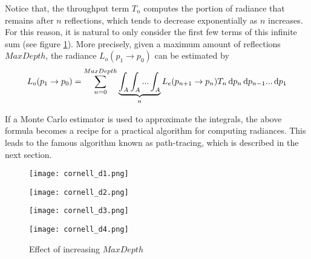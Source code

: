 Notice that, the throughput term $T_n$ computes the portion of radiance that remains after $n$ reflections, which tends to decrease exponentially as $n$ increases. For this reason, it is natural to only consider the first few terms of this infinite sum (see figure \ref{fig maxdepth}). More precisely, given a maximum amount of reflections $MaxDepth$, the radiance $L_o(p_1\to p_0)$ can be estimated by 
\begin{align}
    L_o(p_1\to p_0) = \sum_{n=0}^{MaxDepth} \underbrace{\int_A \int_A...\int_A}_{n} L_e(p_{n+1}\to p_{n})T_n \,\mathrm{d} p_{n} \,\mathrm{d} p_{n-1}...\,\mathrm{d} p_1
    \label{rendering equation path tracing}
\end{align}

If a Monte Carlo estimator is used to approximate the integrals, the above formula becomes a recipe for a practical algorithm for computing radiances. This leads to the famous algorithm known as path-tracing, which is described in the next section.

\begin{figure}[H]
    \centering
    
    \begin{minipage}[t]{.45\textwidth}
        \centering
        \vspace{0pt}
        \texttt{[image: cornell\_d1.png]}
    \end{minipage}
    \begin{minipage}[t]{.45\textwidth}
        \centering
        \vspace{0pt}
        \texttt{[image: cornell\_d2.png]}
    \end{minipage}

    \vspace{0.3cm}

    \begin{minipage}[t]{.45\textwidth}
        \centering
        \vspace{0pt}
        \texttt{[image: cornell\_d3.png]}
    \end{minipage}
    \begin{minipage}[t]{.45\textwidth}
        \centering
        \vspace{0pt}
        \texttt{[image: cornell\_d4.png]}
    \end{minipage}
    \caption{Effect of increasing $MaxDepth$}
    \label{fig maxdepth}
\end{figure}

